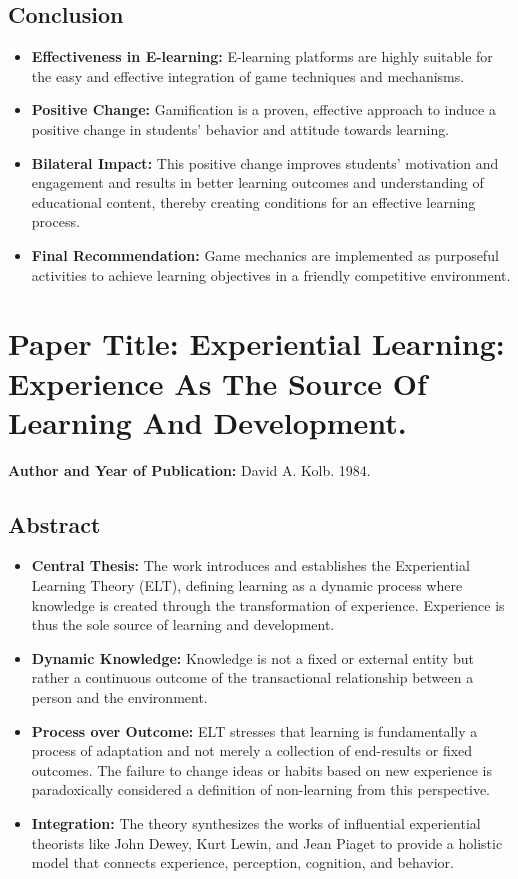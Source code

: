 \documentclass[12pt,a4paper]{report}
\begin{document}
\subsection{Conclusion}
\begin{itemize}
  \item \textbf{Effectiveness in E-learning:} E-learning platforms are highly suitable for the easy and effective integration of game techniques and mechanisms.
  \item \textbf{Positive Change:} Gamification is a proven, effective approach to induce a positive change in students' behavior and attitude towards learning.
  \item \textbf{Bilateral Impact:} This positive change improves students' motivation and engagement and results in better learning outcomes and understanding of educational content, thereby creating conditions for an effective learning process.
  \item \textbf{Final Recommendation:} Game mechanics are implemented as purposeful activities to achieve learning objectives in a friendly competitive environment.
\end{itemize}

\section{Paper Title: Experiential Learning: Experience As The Source Of Learning And Development.}
\textbf{Author and Year of Publication:} David A. Kolb. 1984.

\subsection{Abstract}
\begin{itemize}
  \item \textbf{Central Thesis:} The work introduces and establishes the Experiential Learning Theory (ELT), defining learning as a dynamic process where knowledge is created through the transformation of experience. Experience is thus the sole source of learning and development.
  \item \textbf{Dynamic Knowledge:} Knowledge is not a fixed or external entity but rather a continuous outcome of the transactional relationship between a person and the environment.
  \item \textbf{Process over Outcome:} ELT stresses that learning is fundamentally a process of adaptation and not merely a collection of end-results or fixed outcomes. The failure to change ideas or habits based on new experience is paradoxically considered a definition of non-learning from this perspective.
  \item \textbf{Integration:} The theory synthesizes the works of influential experiential theorists like John Dewey, Kurt Lewin, and Jean Piaget to provide a holistic model that connects experience, perception, cognition, and behavior.
\end{itemize}
\end{document}
